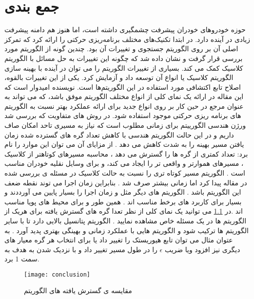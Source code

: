 

\chapter{جمع بندی}

حوزه خودروهای خودران پیشرفت چشمگیری داشته است، اما هنوز هم دامنه پیشرفت زیادی در آینده دارد. 
\cite{paliwal2023survey}
در ابتدا تکنیک‌های مختلف برنامه‌ریزی حرکتی را ارائه کرد که تمرکز اصلی آن بر روی الگوریتم جستجوی
  و تغییرات آن بود. چندین گونه از الگوریتم   مورد بررسی قرار گرفت و نشان داده شد که چگونه این تغییرات به حل مسائل با الگوریتم کلاسیک  کمک می کند. بسیاری از تغییرات الگوریتم   را می توان در آینده با بهینه سازی الگوریتم کلاسیک یا انواع آن توسعه داد و آزمایش کرد. یکی از این تغییرات بالقوه، اصلاح تابع اکتشافی مورد استفاده در این الگوریتم‌ها است. نویسنده امیدوار است که این مقاله در ارائه یک نمای کلی از انواع مختلف الگوریتم   موفق باشد، که می تواند به عنوان مرجع در حین کار بر روی انواع جدید برای ارائه عملکرد بهتر نسبت به الگوریتم های برنامه ریزی حرکتی موجود استفاده شود.
در روش های متفاویت که بررسی شد ورژن هندسی الگورییتم 
برای زمانی مطلوب است که نیاز به مسیری تاحد امکان صاف داریم و در این حالت الگوریتم هندسی با کاهش تعداد گره های گسترده شده زمان یافتن مسیر بهینه را به شدت کاهش می دهد . از مزایای آن می توان این موارد را نام برد:
تعداد کمتری از گره ها را گسترش می دهد ،
محاسبه مسیرهای کوتاهتر از کلاسیک ،
مسیرهای هموارتر و واقعی تر را ایجاد می کند، 
و برای وسایل نقلیه خودران مناسب است .
الگوریتم 
مسیر کوتاه تری را نسبت به حالت کلاسیک در مسئله ی بررسی شده در مقاله پیدا کرد اما زمانی بیشتر صرف شد . بنابراین زمان اجرا می توند نقطه ضعف این الگوریتم باشد .
الگوریتم های دیگر مثل 
و
زمان اجرا را بسیار پایین می آورددند و بسیار برای کاربرد های برخط مناسب اند .
همین طور 
و
برای محیط های پویا مناسب اند .در 
\ref{conclusion}
 می توانید یک نمای کلی از نظر تعدا گره های گسترش یافته برای هریک از الگوریتم ها در یک مسئله خاص مشاهده نمایید .
 الگوریتم 
 پتانسیل بالایی دارد تا با سایر الگوریتم ها ترکیب شود و الگوریتم هایی با عملکرد زمانی و بهینگی بهتری پدید آورد . به عتوان مثال می توان تابع هیوریستک را تغییر داد یا برای انتخاب هر گره معیار های دیگری نیز افزود ویا ضریب 
 $\epsilon$
 را در طول مسیر تغییر داد و با نزدیک شدن به هدف به سمت 1 برد. 
\begin{figure}[h]
	\texttt{[image: conclusion]}
	\centering
	\caption{مقایسه ی گسترش یافته های الگوریتم }
	\cite{paliwal2023survey}
	\label{conclusion}
\end{figure}
\